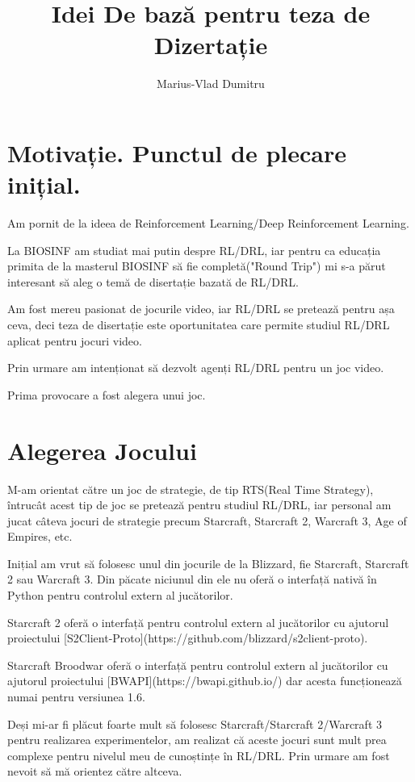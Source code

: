 \documentclass{article}
\title{Idei De bază pentru teza de Dizertație}
\author{Marius-Vlad Dumitru}
\begin{document}
\maketitle
\section{Motivație. Punctul de plecare inițial.}
Am pornit de la ideea de Reinforcement Learning/Deep Reinforcement Learning.

La BIOSINF am studiat mai putin despre RL/DRL, iar pentru ca educația primita de la masterul BIOSINF să fie completă("Round Trip") mi s-a părut interesant să aleg o temă de disertație bazată de RL/DRL.

Am fost mereu pasionat de jocurile video, iar RL/DRL se pretează pentru așa ceva, deci teza de disertație este oportunitatea care permite studiul RL/DRL aplicat pentru jocuri video.

Prin urmare am intenționat să dezvolt agenți RL/DRL pentru un joc video.

Prima provocare a fost alegera unui joc.

\section{Alegerea Jocului}
M-am orientat către un joc de strategie, de tip RTS(Real Time Strategy), întrucât acest tip de joc se pretează pentru studiul RL/DRL, iar personal am jucat câteva jocuri de strategie precum Starcraft, Starcraft 2, Warcraft 3, Age of Empires, etc.

Inițial am vrut să folosesc unul din jocurile de la Blizzard, fie Starcraft, Starcraft 2 sau Warcraft 3. Din păcate niciunul din ele nu oferă o interfață nativă în Python pentru controlul extern al jucătorilor.

Starcraft 2 oferă o interfață pentru controlul extern al jucătorilor cu ajutorul proiectului [S2Client-Proto](https://github.com/blizzard/s2client-proto).

Starcraft Broodwar oferă o interfață pentru controlul extern al jucătorilor cu ajutorul proiectului [BWAPI](https://bwapi.github.io/) dar acesta funcționează numai pentru versiunea 1.6.

Deși mi-ar fi plăcut foarte mult să folosesc Starcraft/Starcraft 2/Warcraft 3 pentru realizarea experimentelor, am realizat că aceste jocuri sunt mult prea complexe pentru nivelul meu de cunoștințe în RL/DRL. Prin urmare am fost nevoit să mă orientez către altceva.
\end{document}
